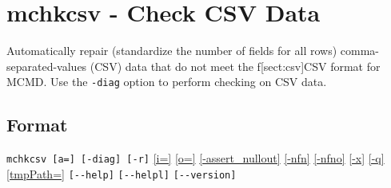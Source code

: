
%

\section{mchkcsv - Check CSV Data\label{sect:mchkcsv}}

Automatically repair (standardize the number of fields for all rows) comma-separated-values (CSV) data that do not meet the f[sect:csv]{CSV format for MCMD}. Use the \verb|-diag| option to perform checking on CSV data.


\subsection*{Format}
\verb|mchkcsv [a=] [-diag] [-r]|
\hyperref[sect:option_o]{[i=]}
\hyperref[sect:option_o]{[o=]}
\hyperref[sect:option_assert_nullout]{[-assert\_nullout]}
\hyperref[sect:option_nfn]{[-nfn]} 
\hyperref[sect:option_nfno]{[-nfno]}
\hyperref[sect:option_x]{[-x]}
\hyperref[sect:option_q]{[-q]}
\hyperref[sect:option_option_tmppath]{[tmpPath=]}
\verb|[--help]|
\verb|[--helpl]|
\verb|[--version]|\\

